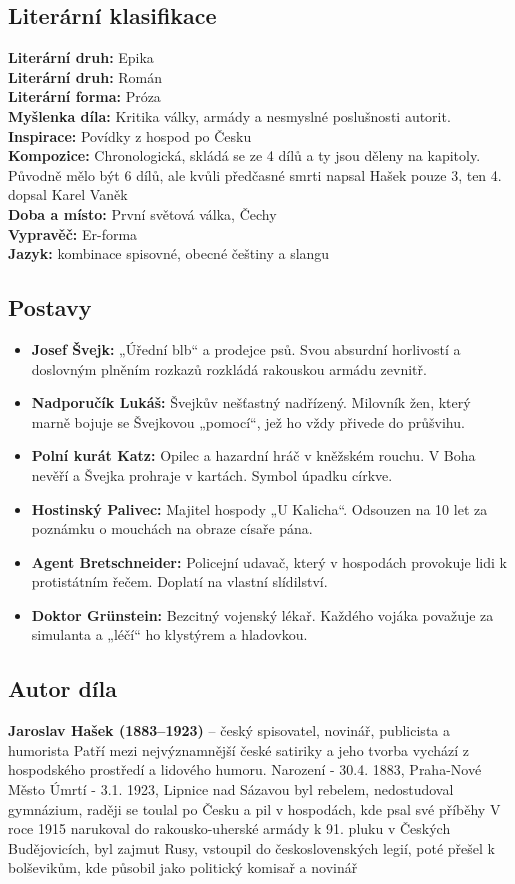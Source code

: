 \documentclass[12pt, a4paper]{article}
\newcommand{\mybf}[1]{\textcolor[RGB]{0, 179, 219}{\textbf{#1}}}
\begin{document}
\subsection*{Literární klasifikace}
\mybf{Literární druh:} Epika\\[3pt]
\mybf{Literární druh:} Román\\[3pt]
\mybf{Literární forma:} Próza\\[10pt]
\mybf{Myšlenka díla:} Kritika války, armády a nesmyslné poslušnosti autorit.\\[10pt]
\mybf{Inspirace:} Povídky z hospod po Česku\\[10pt]
\mybf{Kompozice:} Chronologická, skládá se ze 4 dílů a ty jsou děleny na kapitoly. Původně mělo být 6 dílů, ale kvůli předčasné smrti napsal Hašek pouze 3, ten 4. dopsal Karel Vaněk\\[10pt]
\mybf{Doba a místo:} První světová válka, Čechy\\[10pt]
\mybf{Vypravěč:} Er-forma\\[10pt]
\mybf{Jazyk:} kombinace spisovné, obecné češtiny a slangu

\subsection*{Postavy}
\begin{itemize}[itemsep=0.3em]
	\item \textbf{Josef Švejk:} „Úřední blb“ a prodejce psů. Svou absurdní horlivostí a doslovným    plněním rozkazů rozkládá rakouskou armádu zevnitř.
	\item \textbf{Nadporučík Lukáš:} Švejkův nešťastný nadřízený. Milovník žen, který marně bojuje se  Švejkovou „pomocí“, jež ho vždy přivede do průšvihu.
	\item \textbf{Polní kurát Katz:} Opilec a hazardní hráč v kněžském rouchu. V Boha nevěří a Švejka  prohraje v kartách. Symbol úpadku církve.
	\item \textbf{Hostinský Palivec:} Majitel hospody „U Kalicha“. Odsouzen na 10 let za poznámku o  mouchách na obraze císaře pána.
	\item \textbf{Agent Bretschneider:} Policejní udavač, který v hospodách provokuje lidi k protistátním řečem. Doplatí na vlastní slídilství.
	\item \textbf{Doktor Grünstein:} Bezcitný vojenský lékař. Každého vojáka považuje za simulanta a  „léčí“ ho klystýrem a hladovkou.
\end{itemize}

\subsection*{Autor díla}
\textbf{Jaroslav Hašek (1883--1923)} -- český spisovatel, novinář, publicista a humorista
Patří mezi nejvýznamnější české satiriky a jeho tvorba vychází z hospodského prostředí a lidového humoru.
Narození - 30.4. 1883, Praha-Nové Město
Úmrtí - 3.1. 1923, Lipnice nad Sázavou
byl rebelem, nedostudoval gymnázium, raději se toulal po Česku a pil v hospodách, kde psal své příběhy
V roce 1915 narukoval do rakousko-uherské armády k 91. pluku
v Českých Budějovicích, byl zajmut Rusy, vstoupil do československých
legií, poté přešel k bolševikům, kde působil jako politický komisař a 
novinář
\end{document}
